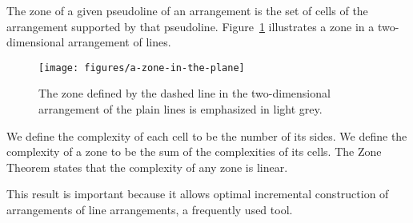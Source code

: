 
The zone of a given pseudoline of an arrangement is the set of cells of the
arrangement supported by that pseudoline.
%
Figure~\ref{fig:a-zone-in-the-plane} illustrates a zone in a two-dimensional
arrangement of lines.
%
\begin{figure}
  \centering{}
  \texttt{[image: figures/a-zone-in-the-plane]}
  \caption{%
    The zone defined by the dashed line in the two-dimensional
    arrangement of the plain lines is emphasized in light grey.%
  }\label{fig:a-zone-in-the-plane}
\end{figure}

We define the complexity of each cell to be the number of its sides.
We define the complexity of a zone to be the sum of the complexities of its cells.
%
The Zone Theorem states that the complexity of any zone is linear.
%



This result is important because it allows optimal
incremental construction of arrangements of line arrangements, a frequently
used tool.
